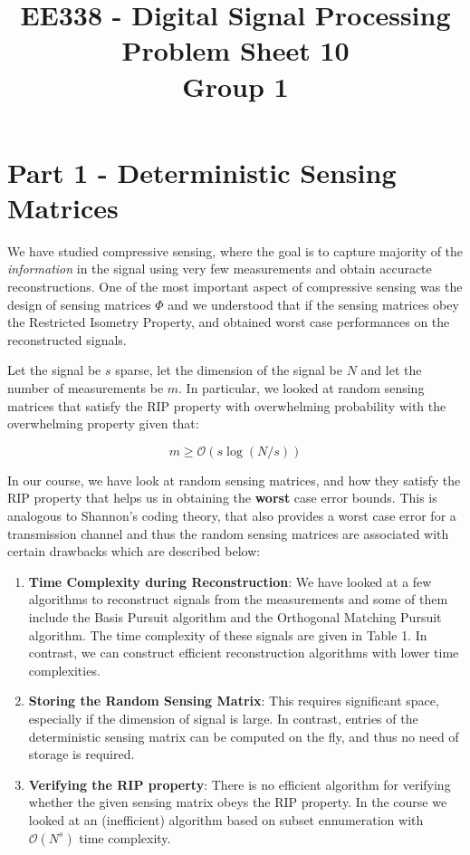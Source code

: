 \documentclass[12pt]{article}
\title{%
  EE338 - Digital Signal Processing  \\
  \large Problem Sheet 10 \\
    Group 1}
\author{}
\date{}
\begin{document}
{

\newtheorem{theorem}{Theorem}
\newtheorem*{theorem*}{Theorem}
\newtheorem{corollary}{Corollary}[theorem]
\newtheorem{lemma}[theorem]{Lemma}
\newtheorem{defn}{Definition}[section]

\section{Part 1 - Deterministic Sensing Matrices}
We have studied compressive sensing, where the goal is to capture majority of the \textit{information} in the signal using very few measurements and obtain accuracte reconstructions. One of the most important aspect of compressive sensing was the design of sensing matrices $\Phi$ and we understood that if the sensing matrices obey the Restricted Isometry Property, and obtained worst case performances on the reconstructed signals. 

Let the signal be $s$ sparse, let the dimension of the signal be $N$ and let the number of measurements be $m$. In particular, we looked at random sensing matrices that satisfy the RIP property with overwhelming probability with the overwhelming property given that:

\begin{equation}
    m \geq \mathcal{O}(s\log(N/s))
\end{equation}

In our course, we have look at random sensing matrices, and how they satisfy the RIP property that helps us in obtaining the \textbf{worst} case error bounds. This is analogous to Shannon's coding theory, that also provides a worst case error for a transmission channel and thus the random sensing matrices are associated with certain drawbacks which are described below:

\begin{enumerate}
    \item \textbf{Time Complexity during Reconstruction}: We have looked at a few algorithms to reconstruct signals from the measurements and some of them include the Basis Pursuit algorithm and the Orthogonal Matching Pursuit algorithm. The time complexity of these signals are given in Table 1. In contrast, we can construct efficient reconstruction algorithms with lower time complexities. 
    \item \textbf{Storing the Random Sensing Matrix}: This requires significant space, especially if the dimension of signal is large. In contrast, entries of the deterministic sensing matrix can be computed on the fly, and thus no need of storage is required.
    \item \textbf{Verifying the RIP property}: There is no efficient algorithm for verifying whether the given sensing matrix obeys the RIP property. In the course we looked at an (inefficient) algorithm based on subset ennumeration with $\mathcal{O}(N^s)$ time complexity.
\end{enumerate}

}
\end{document}

